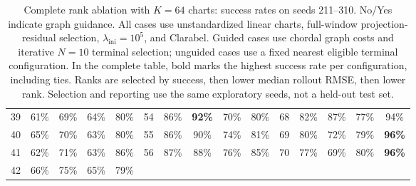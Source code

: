 \begin{table}[t]
\begin{adjustbox}{max width=\linewidth}
\begin{tabular}{@{}c|cccc||c|cccc||c|cccc@{}}
39 & 61\% & 69\% & 64\% & 80\% & 54 & 86\% & \textbf{92\%} & 70\% & 80\% & 68 & 82\% & 87\% & 77\% & 94\% \\
40 & 65\% & 70\% & 63\% & 80\% & 55 & 86\% & 90\% & 74\% & 81\% & 69 & 80\% & 72\% & 79\% & \textbf{96\%} \\
41 & 62\% & 71\% & 63\% & 86\% & 56 & 87\% & 88\% & 76\% & 85\% & 70 & 77\% & 69\% & 80\% & \textbf{96\%} \\
42 & 66\% & 75\% & 65\% & 79\% &  &  &  &  &  &  &  &  &  &  \\
\bottomrule
\end{tabular}
\end{adjustbox}
\caption{Complete rank ablation with $K=64$ charts: success rates on seeds 211--310. No/Yes indicate graph guidance. All cases use unstandardized linear charts, full-window projection-residual selection, $\lambda_{\mathrm{ini}}=10^5$, and Clarabel. Guided cases use chordal graph costs and iterative $N=10$ terminal selection; unguided cases use a fixed nearest eligible terminal configuration. In the complete table, bold marks the highest success rate per configuration, including ties. Ranks are selected by success, then lower median rollout RMSE, then lower rank. Selection and reporting use the same exploratory seeds, not a held-out test set.}
\label{tab:reacher-rank-k64}
\end{table}
